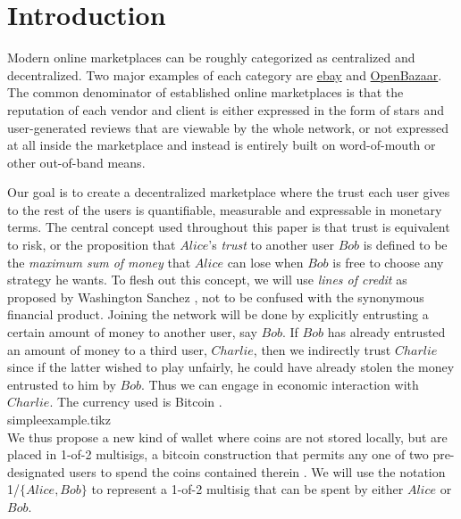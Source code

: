 \section{Introduction}
   Modern online marketplaces can be roughly categorized as centralized and decentralized.
   Two major examples of each category are \href{http://www.ebay.com}{ebay} and \href{https://openbazaar.org/}{OpenBazaar}.
   The common denominator of established online marketplaces is that the reputation of each vendor and client is either
   expressed in the form of stars and user-generated reviews that are viewable by the whole network, or not expressed at
   all inside the marketplace and instead is entirely built on word-of-mouth or other out-of-band means.

   Our goal is to create a decentralized marketplace where the trust each user gives to the rest of the users is
   quantifiable, measurable and expressable in monetary terms. The central concept used throughout this paper is
   that trust is equivalent to risk, or the proposition that $Alice$'s \textit{trust} to another user $Bob$ is defined to
   be the \textit{maximum sum of money} that $Alice$ can lose when $Bob$ is free to choose any strategy he wants. To flesh
   out this concept, we will use \textit{lines of credit} as proposed by Washington Sanchez \cite{loc}, not to be confused
   with the synonymous financial product. Joining the network
   will be done by explicitly entrusting a certain amount of money to another user, say $Bob$. If $Bob$ has already
   entrusted an amount of money to a third user, $Charlie$, then we indirectly trust $Charlie$ since if the latter wished
   to play unfairly, he could have already stolen the money entrusted to him by $Bob$. Thus we can engage in economic
   interaction with $Charlie$. The currency used is Bitcoin \cite{bitcoin}. \medskip \ \\
   {simpleexample.tikz} \smallskip \ \\
   We thus propose a new kind of wallet where coins are not stored locally, but are placed in 1-of-2 multisigs, a bitcoin
   construction that permits any one of two pre-designated users to spend the coins contained therein
   \cite{masteringbitcoin}. We will use the notation 1/$\{Alice, Bob\}$ to represent a 1-of-2 multisig that can be spent by
   either $Alice$ or $Bob$.

